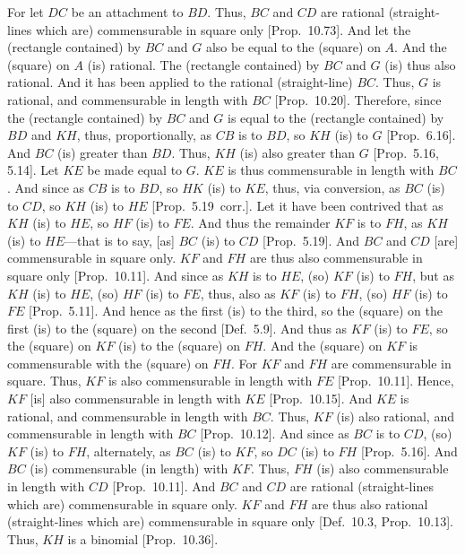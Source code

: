 \begin{Parallel}{}{}
{For let $DC$ be an attachment to $BD$. Thus, $BC$ and $CD$
are rational (straight-lines which are) commensurable in square only [Prop.~10.73]. And let the (rectangle contained)
by $BC$ and $G$ also be equal to the (square) on $A$. And the (square)
on $A$ (is) rational. The (rectangle contained) by $BC$ and $G$ (is) thus also rational. And it has been applied to the rational (straight-line) $BC$.
Thus, $G$ is rational, and commensurable in length with $BC$ [Prop.~10.20]. Therefore, since the (rectangle contained) by $BC$ and $G$ is equal to the (rectangle contained) by
$BD$ and $KH$, thus, proportionally, as $CB$ is to $BD$, so $KH$ (is) to
$G$ [Prop.~6.16]. And $BC$ (is) greater than $BD$.
Thus, $KH$ (is) also greater than $G$ [Prop.~5.16,
5.14]. Let $KE$ be made equal to $G$.
$KE$ is thus commensurable in length with $BC$. And since as
$CB$ is to $BD$, so $HK$ (is) to $KE$, thus, via conversion, as
$BC$ (is) to $CD$, so $KH$ (is) to $HE$ [Prop.~5.19~corr.]. 
Let it have been contrived that as
$KH$ (is) to $HE$, so $HF$ (is) to $FE$. And thus the remainder $KF$ is to
$FH$, as $KH$ (is) to $HE$---that is to say, [as] $BC$ (is) to $CD$
[Prop.~5.19]. And $BC$ and $CD$
[are] commensurable in square only. $KF$ and $FH$ are thus also commensurable in square only [Prop.~10.11].
And since as $KH$ is to $HE$, (so) $KF$ (is) to $FH$, but as $KH$
(is) to $HE$, (so) $HF$ (is) to $FE$, thus, also as $KF$ (is) to $FH$, (so)
$HF$ (is) to $FE$ [Prop.~5.11].
And hence as the first (is) to the third,
so the (square) on the first (is) to the (square) on the second [Def.~5.9].  And thus as $KF$ (is) to $FE$, so the (square) on $KF$ (is) to the (square) on $FH$. And the (square) on $KF$
is commensurable with the (square) on $FH$. For $KF$ and $FH$
are commensurable in square. Thus, $KF$ is also commensurable
in length with  $FE$ [Prop.~10.11]. 
 Hence, $KF$ [is] also commensurable in length with $KE$
  [Prop.~10.15]. And $KE$ is rational,
and commensurable in length with $BC$.  Thus, $KF$ (is) also rational,
and commensurable in length with $BC$ [Prop.~10.12].  And since as $BC$ is to
$CD$, (so)
$KF$ (is) to $FH$, alternately, as $BC$ (is) to $KF$, so $DC$
(is) to $FH$ [Prop.~5.16]. And $BC$ (is) commensurable (in length) with $KF$. Thus, $FH$ (is) also commensurable in length with $CD$ [Prop.~10.11]. And
$BC$ and $CD$ are rational (straight-lines which are) commensurable
in square only. $KF$ and $FH$ are thus also rational (straight-lines which
are) commensurable in square only [Def.~10.3, Prop.~10.13]. Thus, $KH$ is a binomial [Prop.~10.36].

}
\end{Parallel}
